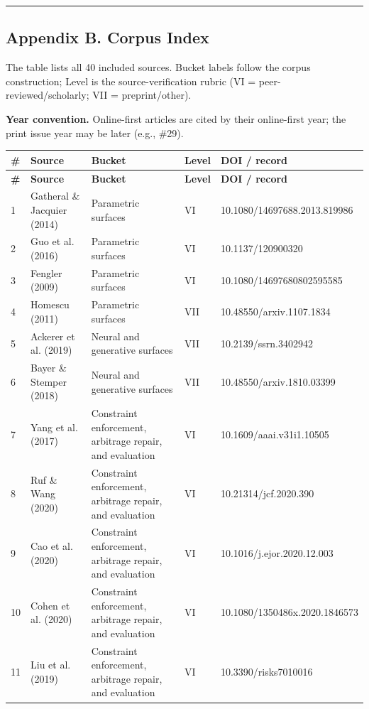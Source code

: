 \documentclass[11pt]{article}
\begin{document}
\par\medskip\hrule\medskip
\subsection*{Appendix B. Corpus Index}
The table lists all 40 included sources. Bucket labels follow the corpus construction; Level is the source-verification rubric (VI = peer-reviewed/scholarly; VII = preprint/other).

\textbf{Year convention.} Online-first articles are cited by their online-first year; the print issue year may be later (e.g., \#29).

\begingroup\small
\begin{longtable}{@{}p{}p{}p{}p{}p{}@{}}
\toprule
\textbf{\#} & \textbf{Source} & \textbf{Bucket} & \textbf{Level} & \textbf{DOI / record} \\
\midrule
\endfirsthead
\toprule
\textbf{\#} & \textbf{Source} & \textbf{Bucket} & \textbf{Level} & \textbf{DOI / record} \\
\midrule
\endhead
1 & Gatheral \& Jacquier (2014) & Parametric surfaces & VI & 10.1080/14697688.2013.819986 \\
2 & Guo et al. (2016) & Parametric surfaces & VI & 10.1137/120900320 \\
3 & Fengler (2009) & Parametric surfaces & VI & 10.1080/14697680802595585 \\
4 & Homescu (2011) & Parametric surfaces & VII & 10.48550/arxiv.1107.1834 \\
5 & Ackerer et al. (2019) & Neural and generative surfaces & VII & 10.2139/ssrn.3402942 \\
6 & Bayer \& Stemper (2018) & Neural and generative surfaces & VII & 10.48550/arxiv.1810.03399 \\
7 & Yang et al. (2017) & Constraint enforcement, arbitrage repair, and evaluation & VI & 10.1609/aaai.v31i1.10505 \\
8 & Ruf \& Wang (2020) & Constraint enforcement, arbitrage repair, and evaluation & VI & 10.21314/jcf.2020.390 \\
9 & Cao et al. (2020) & Constraint enforcement, arbitrage repair, and evaluation & VI & 10.1016/j.ejor.2020.12.003 \\
10 & Cohen et al. (2020) & Constraint enforcement, arbitrage repair, and evaluation & VI & 10.1080/1350486x.2020.1846573 \\
11 & Liu et al. (2019) & Constraint enforcement, arbitrage repair, and evaluation & VI & 10.3390/risks7010016 \\

\end{longtable}
\end{document}
